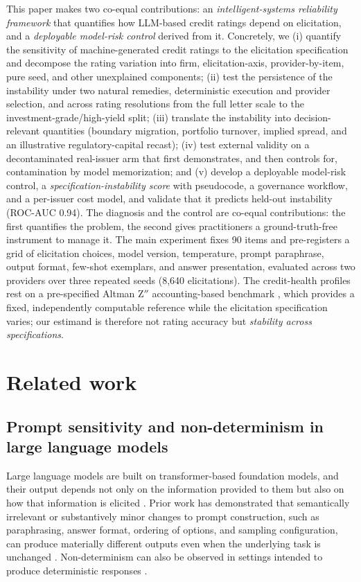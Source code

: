 \documentclass[a4paper,fleqn]{cas-sc}
\begin{document}
This paper makes two co-equal contributions: an \emph{intelligent-systems reliability framework} that
quantifies how LLM-based credit ratings depend on elicitation, and a \emph{deployable model-risk control}
derived from it. Concretely, we (i) quantify the
sensitivity of machine-generated credit ratings to the elicitation specification and decompose the
rating variation into firm, elicitation-axis, provider-by-item, pure seed, and other unexplained
components; (ii) test the persistence of the instability under two natural remedies, deterministic
execution and provider selection, and across rating resolutions from the full letter scale to the
investment-grade/high-yield split; (iii) translate the instability into decision-relevant quantities
(boundary migration, portfolio turnover, implied spread, and an illustrative regulatory-capital recast);
(iv) test external validity on a decontaminated real-issuer arm that first demonstrates, and then
controls for, contamination by model memorization; and (v) develop a deployable model-risk control, a
\emph{specification-instability score} with pseudocode, a governance workflow, and a per-issuer cost
model, and validate that it predicts held-out instability (ROC-AUC 0.94). The diagnosis and the control
are co-equal contributions: the first quantifies the problem, the second gives practitioners a
ground-truth-free instrument to manage it.
The main experiment fixes 90 items and pre-registers a grid of elicitation choices, model version,
temperature, prompt paraphrase, output format, few-shot exemplars, and answer presentation, evaluated
across two providers over three repeated seeds (8{,}640 elicitations). The credit-health profiles rest on
a pre-specified Altman Z$''$ accounting-based benchmark \citep{altman1968}, which provides a fixed,
independently computable reference while the elicitation specification varies; our estimand is therefore
not rating accuracy but \emph{stability across specifications}.

\section{Related work}
\subsection{Prompt sensitivity and non-determinism in large language models}
Large language models are built on transformer-based foundation models, and their output depends not only
on the information provided to them but also on how that information is elicited
\citep{vaswani2017attention,devlin2019bert,bommasani2021foundation}. Prior work has demonstrated that
semantically irrelevant or substantively minor changes to prompt construction, such as paraphrasing,
answer format, ordering of options, and sampling configuration, can produce materially different outputs
even when the underlying task is unchanged \citep{atil2024nondeterminism,sclar2024formatspread}.
Non-determinism can also be observed in settings intended to produce deterministic responses
\citep{atil2024nondeterminism}.
\end{document}
